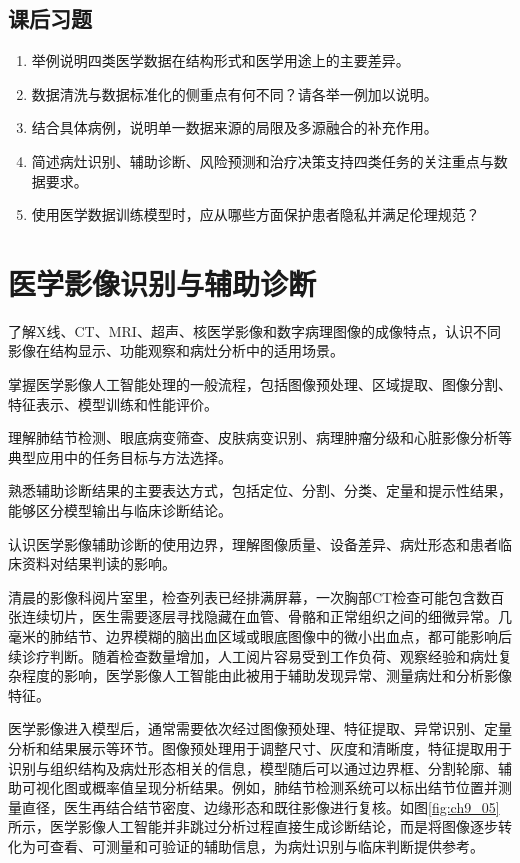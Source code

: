 \bigskip
\subsection*{课后习题}
\begin{enumerate}
\setlength{\itemsep}{3pt}

\item 举例说明四类医学数据在结构形式和医学用途上的主要差异。
\item 数据清洗与数据标准化的侧重点有何不同？请各举一例加以说明。
\item 结合具体病例，说明单一数据来源的局限及多源融合的补充作用。
\item 简述病灶识别、辅助诊断、风险预测和治疗决策支持四类任务的关注重点与数据要求。
\item 使用医学数据训练模型时，应从哪些方面保护患者隐私并满足伦理规范？
\end{enumerate}

\clearpage
\section{医学影像识别与辅助诊断}

\begin{sectionkeypoints}
\item 了解X线、CT、MRI、超声、核医学影像和数字病理图像的成像特点，认识不同影像在结构显示、功能观察和病灶分析中的适用场景。
\item 掌握医学影像人工智能处理的一般流程，包括图像预处理、区域提取、图像分割、特征表示、模型训练和性能评价。
\item 理解肺结节检测、眼底病变筛查、皮肤病变识别、病理肿瘤分级和心脏影像分析等典型应用中的任务目标与方法选择。
\item 熟悉辅助诊断结果的主要表达方式，包括定位、分割、分类、定量和提示性结果，能够区分模型输出与临床诊断结论。
\item 认识医学影像辅助诊断的使用边界，理解图像质量、设备差异、病灶形态和患者临床资料对结果判读的影响。
\end{sectionkeypoints}
清晨的影像科阅片室里，检查列表已经排满屏幕，一次胸部CT检查可能包含数百张连续切片，医生需要逐层寻找隐藏在血管、骨骼和正常组织之间的细微异常。几毫米的肺结节、边界模糊的脑出血区域或眼底图像中的微小出血点，都可能影响后续诊疗判断。随着检查数量增加，人工阅片容易受到工作负荷、观察经验和病灶复杂程度的影响，医学影像人工智能由此被用于辅助发现异常、测量病灶和分析影像特征。

医学影像进入模型后，通常需要依次经过图像预处理、特征提取、异常识别、定量分析和结果展示等环节。图像预处理用于调整尺寸、灰度和清晰度，特征提取用于识别与组织结构及病灶形态相关的信息，模型随后可以通过边界框、分割轮廓、辅助可视化图或概率值呈现分析结果。例如，肺结节检测系统可以标出结节位置并测量直径，医生再结合结节密度、边缘形态和既往影像进行复核。如图\ref{fig:ch9_05}所示，医学影像人工智能并非跳过分析过程直接生成诊断结论，而是将图像逐步转化为可查看、可测量和可验证的辅助信息，为病灶识别与临床判断提供参考。


